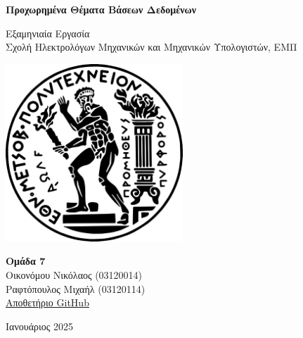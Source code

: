 \documentclass[a4paper,12pt]{article}
\begin{document}
\begin{otherlanguage}{greek}

\begin{titlepage}
    	\centering
    	\vspace*{2cm}

    	\Huge
    	\textbf{Προχωρημένα Θέματα Βάσεων Δεδομένων}

    	\vspace{0.5cm}
    	\LARGE
    	Εξαμηνιαία Εργασία \\
	\Large
    	Σχολή Ηλεκτρολόγων Μηχανικών και Μηχανικών Υπολογιστών, ΕΜΠ

    	\vspace{1.5cm}
    	\includegraphics[width=0.5\textwidth]{ntua.png}

    	\vfill

   	\Large
	\textbf{Ομάδα 7} \\
	Οικονόμου Νικόλαος (03120014) \\
	Ραφτόπουλος Μιχαήλ (03120114) \\
	\vspace{.2cm}
	\large
	\href{https://github.com/ntua-el20114/Advanced-Databases}{Αποθετήριο GitHub}\\

	\vfill

	\normalsize
    	Ιανουάριος 2025

    	\vspace{0.8cm}
\end{titlepage}

\newpage



\end{otherlanguage}
\end{document}
